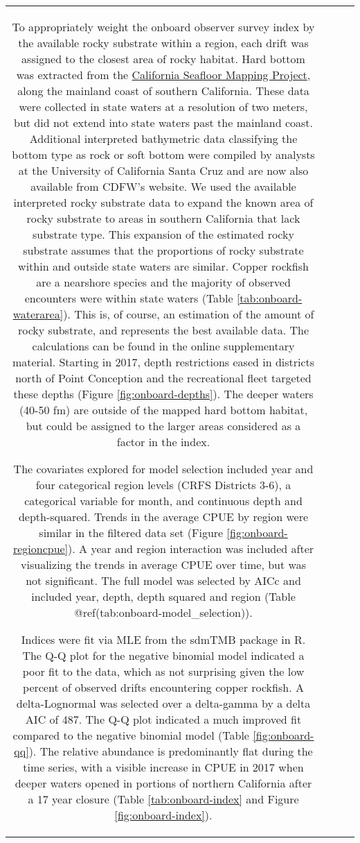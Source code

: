 \documentclass[11pt,
  letterpaper,
]{article}
\begin{document}
\begin{longtable}[t]{c>{\centering\arraybackslash}p{2cm}>{\centering\arraybackslash}p{2cm}>{\centering\arraybackslash}p{2cm}}
To appropriately weight the onboard observer survey index by the available rocky substrate within a region, each drift was assigned to the closest area of rocky habitat. Hard bottom was extracted from the \href{http://seafloor.otterlabs.org/index.html}{California Seafloor Mapping Project}, along the mainland coast of southern California. These data were collected in state waters at a resolution of two meters, but did not extend into state waters past the mainland coast. Additional interpreted bathymetric data classifying the bottom type as rock or soft bottom were compiled by analysts at the University of California Santa Cruz and are now also available from CDFW's website. We used the available interpreted rocky substrate data to expand the known area of rocky substrate to areas in southern California that lack substrate type. This expansion of the estimated rocky substrate assumes that the proportions of rocky substrate within and outside state waters are similar. Copper rockfish are a nearshore species and the majority of observed encounters were within state waters (Table \ref{tab:onboard-waterarea}). This is, of course, an estimation of the amount of rocky substrate, and represents the best available data. The calculations can be found in the online supplementary material. Starting in 2017, depth restrictions eased in districts north of Point Conception and the recreational fleet targeted these depths (Figure \ref{fig:onboard-depths}). The deeper waters (40-50 fm) are outside of the mapped hard bottom habitat, but could be assigned to the larger areas considered as a factor in the index.

The covariates explored for model selection included year and four categorical region levels (CRFS Districts 3-6), a categorical variable for month, and continuous depth and depth-squared. Trends in the average CPUE by region were similar in the filtered data set (Figure \ref{fig:onboard-regioncpue}). A year and region interaction was included after visualizing the trends in average CPUE over time, but was not significant. The full model was selected by AICc and included year, depth, depth squared and region (Table @ref(tab:onboard-model\_selection)).

Indices were fit via MLE from the sdmTMB package in R. The Q-Q plot for the negative binomial model indicated a poor fit to the data, which as not surprising given the low percent of observed drifts encountering copper rockfish. A delta-Lognormal was selected over a delta-gamma by a delta AIC of 487. The Q-Q plot indicated a much improved fit compared to the negative binomial model (Table \ref{fig:onboard-qq}). The relative abundance is predominantly flat during the time series, with a visible increase in CPUE in 2017 when deeper waters opened in portions of northern California after a 17 year closure (Table \ref{tab:onboard-index} and Figure \ref{fig:onboard-index}).


\end{longtable}
\end{document}

